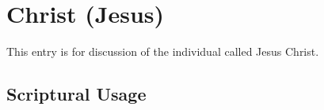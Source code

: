 \section{Christ (Jesus)}
	\label{CHRIST}
	
	This entry is for discussion of the individual called Jesus Christ.
	





\subsection{Scriptural Usage} %
	\label{CHRIST-SCRIPTURES}

	
	

